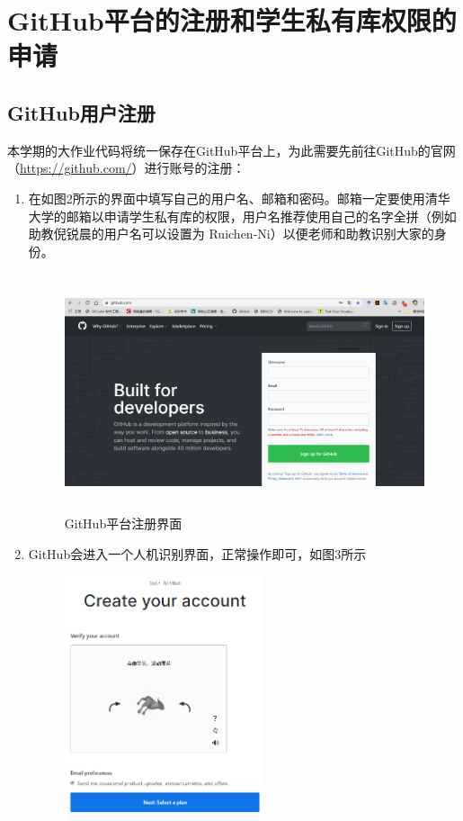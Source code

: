 \documentclass[a4paper,14pt]{article}
\begin{document}
\section{GitHub平台的注册和学生私有库权限的申请}
\subsection*{GitHub用户注册}
本学期的大作业代码将统一保存在GitHub平台上，为此需要先前往GitHub的官网（\url{https://github.com/}）进行账号的注册：
\begin{enumerate}[1. ]
\item 在如图2所示的界面中填写自己的用户名、邮箱和密码。邮箱一定要使用清华大学的邮箱以申请学生私有库的权限，用户名推荐使用自己的名字全拼（例如助教倪锐晨的用户名可以设置为 Ruichen-Ni）以便老师和助教识别大家的身份。
\begin{figure}[h]
\centering
\includegraphics[height=7cm]{figure/GitHub_SignUp}
\caption{GitHub平台注册界面}
\end{figure}
\item GitHub会进入一个人机识别界面，正常操作即可，如图3所示
\begin{figure}[h]
\centering
\includegraphics[height=7cm]{figure/Compute_Verify}

\end{figure}
\end{enumerate}
\end{document}
